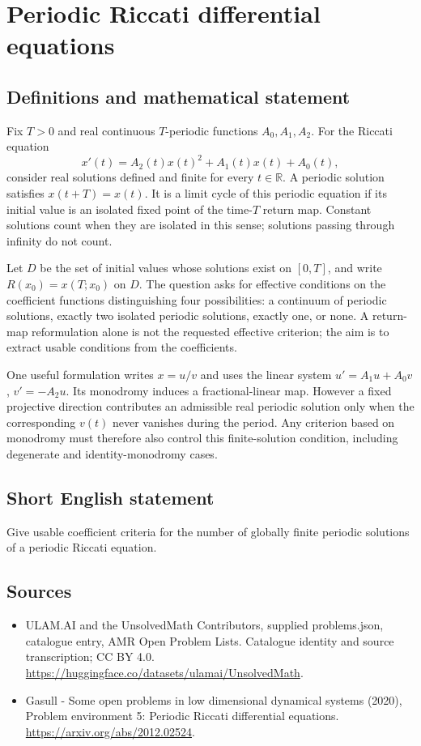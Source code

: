 \documentclass[11pt,a4paper]{article}
\begin{document}
\section*{Periodic Riccati differential equations}\label{statement}

\subsection{Definitions and mathematical statement}
Fix $T>0$ and real continuous $T$-periodic functions $A_0,A_1,A_2$.
For the Riccati equation
\[
 x'(t)=A_2(t)x(t)^2+A_1(t)x(t)+A_0(t),
\]
consider real solutions defined and finite for every $t\in\mathbb R$.
A periodic solution satisfies $x(t+T)=x(t)$. It is a limit cycle of this
periodic equation if its initial value is an isolated fixed point of the
time-$T$ return map. Constant solutions count when they are isolated in
this sense; solutions passing through infinity do not count.

Let $D$ be the set of initial values whose solutions exist on $[0,T]$, and
write $R(x_0)=x(T;x_0)$ on $D$. The question asks for effective conditions on
the coefficient functions distinguishing four possibilities: a continuum
of periodic solutions, exactly two isolated periodic solutions, exactly one,
or none. A return-map reformulation alone is not the requested effective
criterion; the aim is to extract usable conditions from the coefficients.

One useful formulation writes $x=u/v$ and uses the linear system
$u'=A_1u+A_0v$, $v'=-A_2u$. Its monodromy induces a fractional-linear map.
However a fixed projective direction contributes an admissible real periodic
solution only when the corresponding $v(t)$ never vanishes during the period.
Any criterion based on monodromy must therefore also control this
finite-solution condition, including degenerate and identity-monodromy cases.
\subsection{Short English statement}
Give usable coefficient criteria for the number of globally finite periodic solutions of a periodic Riccati equation.
\subsection{Sources}
\begin{itemize}
\item[S1] ULAM.AI and the UnsolvedMath Contributors, supplied problems.json, catalogue entry, AMR Open Problem Lists. Catalogue identity and source transcription; CC BY 4.0.
\url{https://huggingface.co/datasets/ulamai/UnsolvedMath}.
\item[S2] Gasull - Some open problems in low dimensional dynamical systems (2020), Problem environment 5: Periodic Riccati differential equations. 
\url{https://arxiv.org/abs/2012.02524}.
\end{itemize}
\end{document}

